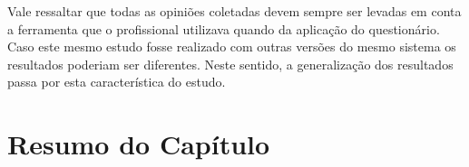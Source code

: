 Vale ressaltar que todas as opiniões coletadas devem sempre ser levadas em conta
a ferramenta que o profissional utilizava quando da aplicação do questionário.
Caso este mesmo estudo fosse realizado com outras versões do mesmo sistema os
resultados poderiam ser diferentes. Neste sentido, a generalização dos
resultados passa por esta característica do estudo.

\section{Resumo do Capítulo}
\label{sec:resumo_do_capitulo}
